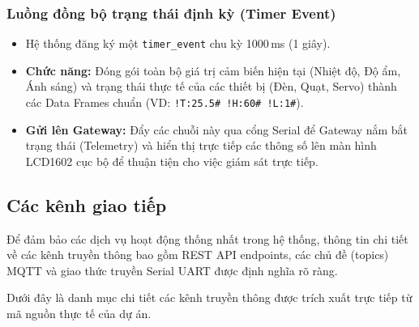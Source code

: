 \subsubsection{Luồng đồng bộ trạng thái định kỳ (Timer Event)}
\begin{itemize}
    \item Hệ thống đăng ký một \texttt{timer\_event} chu kỳ 1000\,ms (1 giây).
    \item \textbf{Chức năng:} Đóng gói toàn bộ giá trị cảm biến hiện tại (Nhiệt độ, Độ ẩm, Ánh sáng) và trạng thái thực tế của các thiết bị (Đèn, Quạt, Servo) thành các Data Frames chuẩn (VD: \texttt{!T:25.5\# !H:60\# !L:1\#}).
    \item \textbf{Gửi lên Gateway:} Đẩy các chuỗi này qua cổng Serial để Gateway nắm bắt trạng thái (Telemetry) và hiển thị trực tiếp các thông số lên màn hình LCD1602 cục bộ để thuận tiện cho việc giám sát trực tiếp.
\end{itemize}

\subsection{Các kênh giao tiếp}
Để đảm bảo các dịch vụ hoạt động thống nhất trong hệ thống, thông tin chi tiết về các kênh truyền thông bao gồm REST API endpoints, các chủ đề (topics) MQTT và giao thức truyền Serial UART được định nghĩa rõ ràng.

Dưới đây là danh mục chi tiết các kênh truyền thông được trích xuất trực tiếp từ mã nguồn thực tế của dự án.

